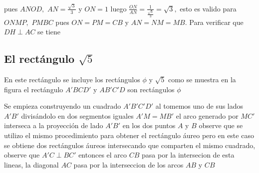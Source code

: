 \documentclass[a4paper]{book}
\begin{document}
pues $ANOD,$ $AN=\frac{\sqrt{3}}{3}$ y $ON=1$ luego $\frac{ON}{AN}=\frac{1}{\frac{\sqrt{3}}{3}}=\sqrt{3},$ esto es valido para $ONMP,$ $PMBC$ pues $ON=PM=CB$ y $AN=NM=MB.$ Para verificar que $DH\perp AC$ se tiene

\subsection{El rectángulo $\sqrt{5}$}

En este rectángulo se incluye los rectángulos $\phi$ y $\sqrt{5}$  como se muestra en la figura el rectángulo $A'BCD'$ y $AB'C'D$ son rectángulos $\phi$

Se empieza construyendo un cuadrado $A'B'C'D'$ al tomemos uno de sus lados $A'B'$ divisándolo en dos segmentos iguales $A'M=MB'$ el arco generado por $MC'$ interseca a la proyección de lado $A'B'$ en los dos puntos $A$ y $B$ observe que se utilizo el mismo procedimiento para obtener el rectángulo áureo pero en este caso se obtiene dos rectángulos áureos intersecando que comparten el mismo cuadrado, observe que $A'C\perp BC'$ entonces el arco $CB$ pasa por la intersecion de esta lineas, la diagonal $AC$ pasa por la interseccion de los arcos $AB$ y $CB$
\end{document}
